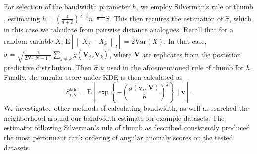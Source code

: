 For selection of the bandwidth parameter $h$, we employ Silverman's rule of
    thumb \citep{silverman2018}, estimating 
    $h = \left(\frac{4}{d+2}\right)^{\frac{1}{d+4}}
        n^{-\frac{1}{d+4}}\hat{\sigma}$.
    This then requires the estimation of $\hat{\sigma}$, which in this case we
    calculate from pairwise distance analogues.  Recall that for a random 
    variable $X$,
    $\text{E}\left[\left\lVert X_j - X_k\right\rVert_2\right] 
        = 2\text{Var}(X)$.
    In that case, $\hat{\sigma} = 
        \sqrt{\frac{1}{2N(N-1)}\sum_{j\neq k}g(\bm{V}_j,\bm{V}_k)}$, where
    $\bm{V}$ are replicates from the posterior predictive distribution.
    Then $\hat{\sigma}$ is used in the aforementioned rule of thumb for $h$.
    Finally, the angular score under KDE is then calculated as
    \begin{equation}
    \label{eqn:ad_kde_h}
    S_{i,\bm{v}}^{\text{kde}} = \text{E}\left[\exp\left\lbrace -
    \left(\frac{g(\bm{v}_i,\bm{V})}{h}\right)^2\right\rbrace\mid\bm{v}\right].
    \end{equation}
    We investigated other methods of calculating bandwidth, as well as searched
    the neighborhood around our bandwidth estimate for example datasets.
    The estimator following Silverman's rule of thumb as described consistently 
    produced the most performant rank ordering of angular anomaly scores on the
    tested datasets.



